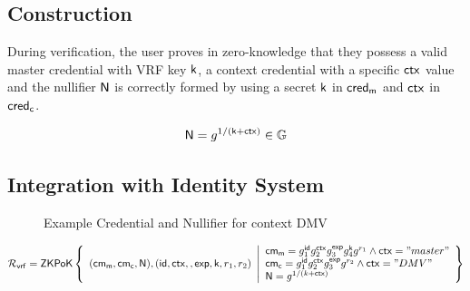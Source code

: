 \subsection{Construction}
During verification, the user proves in zero-knowledge that they possess a valid master credential with VRF key $\mathsf{k}$, a context credential with a specific $\mathsf{ctx}$ value and the nullifier $\mathsf{N}$ is correctly formed by using a secret $\mathsf{k}$ in $\mathsf{cred_m}$ and $\mathsf{ctx}$ in $\mathsf{cred_c}$. 

\begin{equation}
\mathsf{N} = g^{1/(\mathsf{k} + \mathsf{ctx})} \in \mathbb{G}
\end{equation}

\subsection{Integration with Identity System}


\begin{figure}
        \begin{pchstack}[boxed, center, space=4em]
            \begin{pcvstack}
            \end{pcvstack}
            \pcvspace
            \begin{pcvstack}
            \end{pcvstack}
            \begin{pcvstack}
            \end{pcvstack}
        \end{pchstack}
    \caption{Example Credential and Nullifier for context DMV}
    \label{fig:two-creds}
\end{figure}


\[
    \mathcal{R}_{\mathsf{vrf}} = {\mathsf{ZKPoK}} \left\{ 
    \begin{array}{l} 
    (\mathsf{cm_m}, \mathsf{cm_c}, \mathsf{N}), (\mathsf{id}, \mathsf{ctx}, , \mathsf{exp}, \mathsf{k}, r_1, r_2) \\
    \end{array} 
    \middle|
    \begin{array}{l}
        \mathsf{cm_m} = g_1^{\mathsf{id}}g_2^{\mathsf{ctx}}g_3^{\mathsf{exp}}g_4^{\mathsf{k}}g^{r_1}  \wedge \mathsf{ctx}="master" \\
        \mathsf{cm_c} = g_1^{\mathsf{id}}g_2^{\mathsf{ctx}}g_3^{\mathsf{exp}}g^{r_2} \wedge \mathsf{ctx}="DMV" \\
        \mathsf{N} = g^{1/(k + \mathsf{ctx})}
    \end{array} 
    \right\}
\]
    



